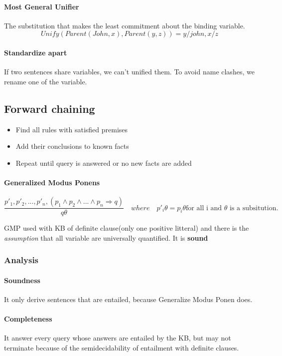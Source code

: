 \paragraph{Most General Unifier} The  substitution that makes the least 
commitment about the binding variable.
$$ Unify (Parent(John, x), Parent(y,z)) = {y/john, x/z}$$

\paragraph{Standardize apart} If two sentences share variables, we can't
unified them. To avoid name clashes, we rename one of the variable.

\subsection{Forward chaining}
	\begin{itemize}
		\item Find all rules with satisfied premises
		\item Add their conclusions to known facts
		\item Repeat until query is answered or no new facts are added
	\end{itemize}

\paragraph{Generalized                   Modus                   Ponens}
$$\frac{p'_1,p'_2,...,p'_n,(p_1\wedge     p_2\wedge    ...\wedge     p_n
\Rightarrow q)}{q\theta} \quad where \quad p'_i\theta=p_i\theta \textrm{
for all i and } \theta \textrm{ is a subsitution.} $$

GMP  used with  KB of  definite clause(only  one positive  litteral) and
there is the \textit{assumption} that all variable are universally quantified. It
is \textbf{sound}

\subsubsection{Analysis}

\paragraph{Soundness}  It  only  derive  sentences  that  are  entailed,
because Generalize Modus Ponen does.

\paragraph{Completeness}  It  answer  every   query  whose  answers  are
entailed   by  the   KB,  but   may   not  terminate   because  of   the
semidecidability of entailment with definite clauses.

